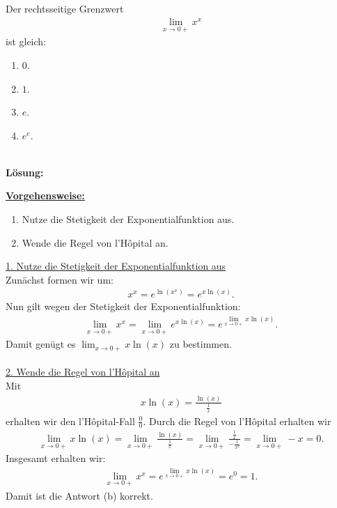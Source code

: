 \subsection*{}
Der rechtsseitige Grenzwert
\begin{align*}
	\lim\limits_{x \to 0 +}
	x^x
\end{align*}
ist gleich:
\renewcommand{\labelenumi}{(\alph{enumi})}
\begin{enumerate}
	\item 
	$0$.
	\item
	$1$.
	\item
	$e$.
	\item
	$e^e$.	
\end{enumerate}
\ \\
\textbf{Lösung:}
\begin{mdframed}
\underline{\textbf{Vorgehensweise:}}
\renewcommand{\labelenumi}{\theenumi.}
\begin{enumerate}
\item Nutze die Stetigkeit der Exponentialfunktion aus.
\item Wende die Regel von l'H\^{o}pital an.
\end{enumerate}
\end{mdframed}

\underline{1. Nutze die Stetigkeit der Exponentialfunktion aus}\\
Zunächst formen wir um:
\begin{align*}
	x^x = e^{\ln\left(x^x\right)} = e^{x \ln(x)}.
\end{align*}
Nun gilt wegen der Stetigkeit der Exponentialfunktion:
\begin{align*}
	\lim \limits_{x \to 0 +}
	x^x 
	=
	\lim \limits_{x \to 0 +}
	e^{x \ln(x)}
	=
	e^{\lim_{x \to 0 +} x \ln(x)}.
\end{align*}
Damit genügt es $ \lim_{x \to 0 +} x \ln(x) $ zu bestimmen.\\
\\
\underline{2. Wende die Regel von l'H\^{o}pital an}\\
Mit 
\begin{align*}
	x \ln(x)
	=
	\frac{\ln(x)}{\frac{1}{x}}
\end{align*}
erhalten wir den l'H\^{o}pital-Fall \glqq$ \frac{0}{0} $\grqq.
Durch die Regel von l'H\^{o}pital erhalten wir 
\begin{align*}
	\lim \limits_{x \to 0 +} x \ln(x)
	=
	\lim \limits_{x \to 0 +} \frac{\ln(x)}{\frac{1}{x}}
	=
	\lim \limits_{x \to 0 +} \frac{\frac{1}{x}}{-\frac{1}{x^2}}
	=
	\lim \limits_{x \to 0 +} -x = 0.
\end{align*}
Insgesamt erhalten wir:
\begin{align*}
	\lim \limits_{x \to 0 +} x^x
	=
	e^{\lim_{x \to 0 +} x \ln(x)}
	=
	e^0
	= 
	1.
\end{align*}
Damit ist die Antwort (b) korrekt.




